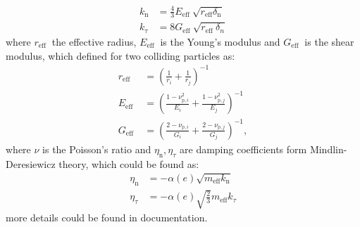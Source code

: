 \begin{equation}
\begin{aligned}
k_{\mathrm{n}} & =\frac{4}{3} E_{\text {eff }} \sqrt{r_{\mathrm{eff}} \delta_{\mathrm{n}}} \\
k_{\tau} & =8 G_{\text {eff }} \sqrt{r_{\text {eff }} \delta_{n}}
\end{aligned}
\end{equation}
where $r_{\text {eff }}$ the effective radius, $E_{\text {eff }}$ is the Young’s modulus and $G_{\text {eff }}$ is the shear modulus, which defined for two colliding particles as:
\begin{equation}
\begin{aligned}
r_{\mathrm{eff}} & =\left(\frac{1}{r_i}+\frac{1}{r_j}\right)^{-1} \\
E_{\text {eff }} & =\left(\frac{1-\nu_{\mathrm{p}, i}^2}{E_i}+\frac{1-\nu_{\mathrm{p}, j}^2}{E_j}\right)^{-1} \\
G_{\text {eff }} & =\left(\frac{2-\nu_{\mathrm{p}, i}}{G_i}+\frac{2-\nu_{\mathrm{p}, j}}{G_j}\right)^{-1},
\end{aligned}
\end{equation}
where $\nu$ is the Poisson’s ratio and $ \eta_{\mathrm{n}}, \eta_{\tau}$ are damping coefficients form Mindlin-Deresiewicz \cite{mindlin1953elastic} theory, which could be found as:
\begin{equation}
\begin{aligned}
 \eta_{\mathrm{n}} &= -\alpha(e) \sqrt{m_{\mathrm{eff}} k_{\mathrm{n}}} \\
 \eta_{\tau} &= -\alpha(e) \sqrt{\frac{2}{3}} m_{\mathrm{eff}} k_{\tau}
\end{aligned}
\end{equation}
more details could be found in \cite{LIGGGHTS} documentation.


